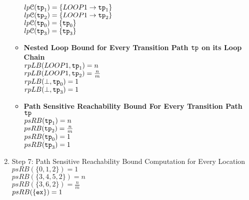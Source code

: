 \begin{enumerate}
\begin{itemize}
  $lp\mathcal{C}(\mathtt{tp}_1) = \{LOOP1\to \mathtt{tp}_1\}$ \\
  $lp\mathcal{C}(\mathtt{tp}_2) = \{LOOP1\to \mathtt{tp}_2\}$ \\
  $lp\mathcal{C}(\mathtt{tp}_0) = \{\mathtt{tp}_0\}$ \\
  $lp\mathcal{C}(\mathtt{tp}_3) = \{\mathtt{tp}_3\}$ 
  \item \textbf{Nested Loop Bound for Every Transition Path $\mathtt{tp}$ on its Loop Chain}
  \\
  $rpLB(LOOP1, \mathtt{tp}_1) = n$ \\
  $rpLB(LOOP1, \mathtt{tp}_2) = \frac{n}{m}$  \\
  $rpLB(\bot, \mathtt{tp}_0) = 1$ \\
  $rpLB(\bot, \mathtt{tp}_3) = 1$ 
  \item \textbf{Path Sensitive Reachability Bound For Every Transition Path $\mathtt{tp}$ }
  \\
  $psRB(\mathtt{tp}_1) = n$ \\
  $psRB(\mathtt{tp}_2) = \frac{n}{m}$ \\
  $psRB(\mathtt{tp}_0) = 1$ \\
  $psRB(\mathtt{tp}_3) = 1$ 
\end{itemize}
\item Step 7: Path Sensitive Reachability Bound Computation for Every Location
\\
$psRB(\{0, 1, 2\}) = 1$ \\
$psRB(\{3, 4, 5, 2 \}) = n$ \\
$psRB(\{3, 6, 2\}) = \frac{n}{m}$ \\
$psRB(\{\mathtt{ex}\}) = 1$ 
\end{enumerate}